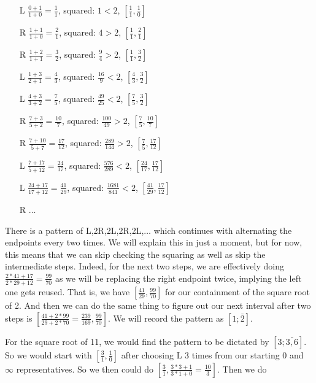 \documentclass[12pt]{article}
\theoremstyle{remark}
\begin{document}
\begin{itemize}
    \item[L] $\tfrac{0+1}{1+0} = \tfrac{1}{1}$, squared: $1 < 2$,  $[\tfrac{1}{1},\tfrac{1}{0}] $
    \item[R] $\tfrac{1+1}{1+0} = \tfrac{2}{1}$, squared: $4 > 2$, $[\tfrac{1}{1},\tfrac{2}{1}]$
    \item[R] $\tfrac{1+2}{1+1} = \tfrac{3}{2}$, squared: $\tfrac{9}{4} > 2$, $[\tfrac{1}{1},\tfrac{3}{2}]$
    \item[L] $\tfrac{1+3}{2+1} = \tfrac{4}{3}$, squared: $\tfrac{16}{9} < 2$, $[\tfrac{4}{3},\tfrac{3}{2}]$
    \item[L] $\tfrac{4+3}{3+2} = \tfrac{7}{5}$, squared: $\tfrac{49}{25} < 2$, 
    $[\tfrac{7}{5},\tfrac{3}{2}]$
    \item[R] $\tfrac{7+3}{5+2} = \tfrac{10}{7}$, squared: $\tfrac{100}{49} > 2$, 
    $[\tfrac{7}{5},\tfrac{10}{7}]$
    \item[R] $\tfrac{7+10}{5+7} = \tfrac{17}{12}$, squared: $\tfrac{289}{144} > 2$, 
    $[\tfrac{7}{5},\tfrac{17}{12}]$
    \item[L] $\tfrac{7+17}{5+12} = \tfrac{24}{17}$, squared: $\tfrac{576}{289} < 2$, 
    $[\tfrac{24}{17},\tfrac{17}{12}]$
    \item[L] $\tfrac{24+17}{17+12} = \tfrac{41}{29}$, squared: $\tfrac{1681}{841} < 2$, 
    $[\tfrac{41}{29},\tfrac{17}{12}]$
    \item[R] $\ldots$
\end{itemize}

There is a pattern of L,2R,2L,2R,2L,$\ldots$ which continues with alternating the endpoints every two times. We will explain this in just a moment, but for now, this means that we can skip checking the squaring as well as skip the intermediate steps. Indeed, for the next two steps, we are effectively doing $\tfrac{2*41 + 17}{2*29 + 12} = \tfrac{99}{70}$ as we will be replacing the right endpoint twice, implying the left one gets reused. That is, we have $[\tfrac{41}{29}, \tfrac{99}{70}]$ for our containment of the square root of 2. And then we can do the same thing to figure out our next interval after two steps is $[\tfrac{41+2*99}{29+2*70}=\tfrac{239}{169}, \tfrac{99}{70}]$. We will record the pattern as $[1; \bar{2}]$.

For the square root of 11, we would find the pattern to be dictated by $[3;\bar{3,6}]$. So we would start with $[\tfrac{3}{1}, \tfrac{1}{0}]$ after choosing L 3 times from our starting 0 and $\infty$ representatives. So we then could do $[\tfrac{3}{1}, \tfrac{3*3 + 1}{3*1 + 0} = \tfrac{10}{3}]$. Then we do 
\end{document}
